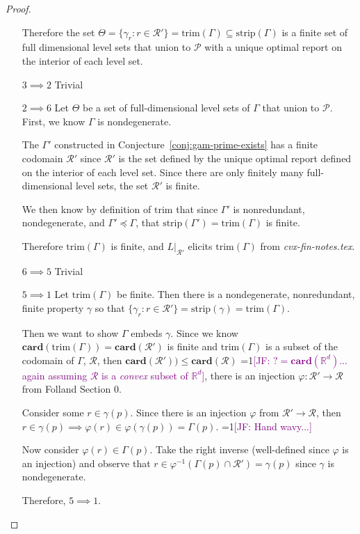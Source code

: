 \documentclass[12pt]{article}
\newcommand{\Comments}{1}
\newcommand{\mynote}[2]{\ifnum\Comments=1\textcolor{#1}{#2}\fi}
\newcommand{\jessie}[1]{\mynote{purple}{[JF: #1]}}
\newcommand{\reals}{\mathbb{R}}
\renewcommand{\P}{\mathcal{P}}
\newcommand{\R}{\mathcal{R}}
\newcommand{\trim}{\mathrm{trim}}
\newcommand{\strip}{\mathrm{strip}}
\newcommand{\card}{\textbf{card}}
\begin{document}
\begin{proof}
\begin{enumerate}
Therefore the set $\Theta = \{\gamma_r : r \in \R' \} = \trim(\Gamma) \subseteq \strip(\Gamma)$ is a finite set of full dimensional level sets that union to $\P$ with a unique optimal report on the interior of each level set. 
\item[$3 \implies 2$] Trivial
\item[$2 \implies 6$]
Let $\Theta$ be a set of full-dimensional level sets of $\Gamma$ that union to $\P$.
First, we know $\Gamma$ is nondegenerate.

The $\Gamma'$ constructed in Conjecture~\ref{conj:gam-prime-exists} has a finite codomain $\R'$ since $\R'$ is the set defined by the unique optimal report defined on the interior of each level set.
Since there are only finitely many full-dimensional level sets, the set $\R'$ is finite.

We then know by definition of $\trim$ that since $\Gamma'$ is nonredundant, nondegenerate, and $\Gamma' \preceq \Gamma$, that $\strip(\Gamma') = \trim(\Gamma)$ is finite.

Therefore $\trim(\Gamma)$ is finite, and $L|_{\R'}$ elicits $\trim(\Gamma)$ from \emph{cvx-fin-notes.tex}.

\item[$6 \implies 5$] Trivial
\item[$5 \implies 1$] Let $\trim(\Gamma)$ be finite.
Then there is a nondegenerate, nonredundant, finite property $\gamma$ so that $\{ \gamma_r : r \in \R' \} = \strip(\gamma) = \trim(\Gamma)$.

Then we want to show $\Gamma$ embeds $\gamma$.
Since we know $\card(\trim(\Gamma)) = \card(\R')$ is finite and $\trim(\Gamma)$ is a subset of the codomain of $\Gamma$, $\R$, then $\card(\R')) \leq \card(\R)$ \jessie{$?= \card(\reals^d)$... again assuming $\R$ is a \emph{convex} subset of $\reals^d$}, there is an injection $\varphi : \R' \to \R$ from Folland Section 0.

Consider some $r \in \gamma(p)$.
Since there is an injection $\varphi$ from $\R' \to \R$, then $r \in \gamma(p) \implies \varphi(r) \in \varphi(\gamma(p)) = \Gamma(p)$.
\jessie{Hand wavy...}

Now consider $\varphi(r) \in \Gamma(p)$.
Take the right inverse (well-defined since $\varphi$ is an injection) and observe that $r \in \varphi^{-1}(\Gamma(p) \cap \R') = \gamma(p)$ since $\gamma$ is nondegenerate.

Therefore, $5 \implies 1$.





\end{enumerate}
\end{proof}
\end{document}
